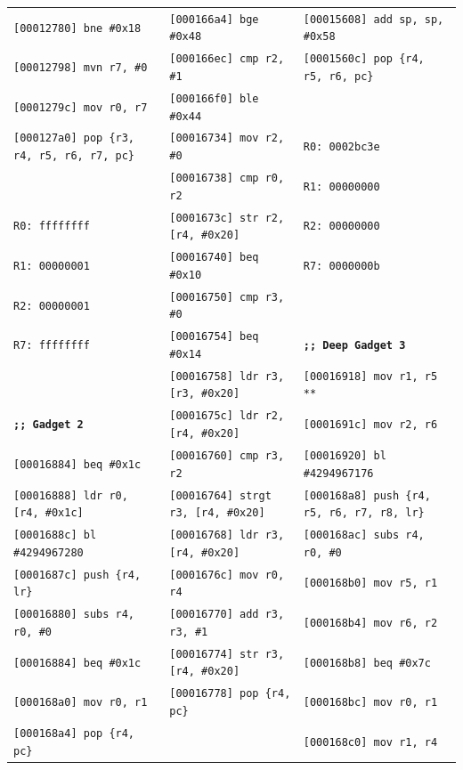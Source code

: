 \begin{table}
\begin{center}
{\begin{tabular}{|l|l|l|}
\texttt{[00012780]  bne \#0x18}	& \texttt{[000166a4]  bge \#0x48}			& \texttt{[00015608]  add sp, sp, \#0x58} \\
\texttt{[00012798]  mvn r7, \#0}	& \texttt{[000166ec]  cmp r2, \#1}			& \texttt{[0001560c]  pop \{r4, r5, r6, pc\}} \\
\texttt{[0001279c]  mov r0, r7}	& \texttt{[000166f0]  ble \#0x44}			& \\
\texttt{[000127a0]  pop \{r3, r4, r5, r6, r7, pc\}} & \texttt{[00016734]  mov r2, \#0} & \texttt{R0: 0002bc3e} \\
 						& \texttt{[00016738]  cmp r0, r2}			& \texttt{R1: 00000000} \\
\texttt{R0: ffffffff}			& \texttt{[0001673c]  str r2, [r4, \#0x20]}		& \texttt{R2: 00000000} \\
\texttt{R1: 00000001}		& \texttt{[00016740]  beq \#0x10}			& \texttt{R7: 0000000b} \\
\texttt{R2: 00000001}		& \texttt{[00016750]  cmp r3, \#0}			& \\
\texttt{R7: ffffffff}			& \texttt{[00016754]  beq \#0x14}			& \textbf{\texttt{;; Deep Gadget 3}} \\
 					& \texttt{[00016758]  ldr r3, [r3, \#0x20]}	& \texttt{[00016918]  mov r1, r5   **}\\
\textbf{\texttt{;; Gadget 2}}		& \texttt{[0001675c]  ldr r2, [r4, \#0x20]}		& \texttt{[0001691c]  mov r2, r6} \\
\texttt{[00016884]  beq \#0x1c}	& \texttt{[00016760]  cmp r3, r2}			& \texttt{[00016920]  bl \#4294967176} \\
\texttt{[00016888]  ldr r0, [r4, \#0x1c]} & \texttt{[00016764]  strgt r3, [r4, \#0x20]} & \texttt{[000168a8]  push \{r4, r5, r6, r7, r8, lr\}} \\
\texttt{[0001688c]  bl \#4294967280} & \texttt{[00016768]  ldr r3, [r4, \#0x20]}	& \texttt{[000168ac]  subs r4, r0, \#0} \\
\texttt{[0001687c]  push \{r4, lr\}}	& \texttt{[0001676c]  mov r0, r4}		& \texttt{[000168b0]  mov r5, r1} \\
\texttt{[00016880]  subs r4, r0, \#0} & \texttt{[00016770]  add r3, r3, \#1}		& \texttt{[000168b4]  mov r6, r2} \\
\texttt{[00016884]  beq \#0x1c}	& \texttt{[00016774]  str r3, [r4, \#0x20]}		& \texttt{[000168b8]  beq \#0x7c} \\
\texttt{[000168a0]  mov r0, r1}	& \texttt{[00016778]  pop \{r4, pc\}}			& \texttt{[000168bc]  mov r0, r1} \\
\texttt{[000168a4]  pop \{r4, pc\}}	&							& \texttt{[000168c0]  mov r1, r4} \\

\end{tabular}}
\end{center}
\end{table}
